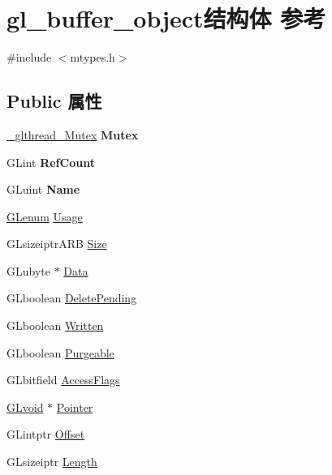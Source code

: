 \hypertarget{structgl__buffer__object}{}\section{gl\+\_\+buffer\+\_\+object结构体 参考}
\label{structgl__buffer__object}


{\ttfamily \#include $<$mtypes.\+h$>$}

\subsection*{Public 属性}
\begin{DoxyCompactItemize}
\item 
\mbox{\label{structgl__buffer__object_a7c4e3ea132cd21993e081d7176bfadf7}} 
\hyperlink{struct___c_r_i_t_i_c_a_l___s_e_c_t_i_o_n}{\+\_\+glthread\+\_\+\+Mutex} {\bfseries Mutex}
\item 
\mbox{\label{structgl__buffer__object_a6d7e11ec2690e5911729a4dcb89082be}} 
G\+Lint {\bfseries Ref\+Count}
\item 
\mbox{\label{structgl__buffer__object_a3db8590422016a58e5961388ff46ebab}} 
G\+Luint {\bfseries Name}
\item 
\hyperlink{interfacevoid}{G\+Lenum} \hyperlink{structgl__buffer__object_a352e4e28541f5fce5a15d37c83f5c575}{Usage}
\item 
G\+Lsizeiptr\+A\+RB \hyperlink{structgl__buffer__object_a471e97d10220fafccb2437b0ae2a8793}{Size}
\item 
G\+Lubyte $\ast$ \hyperlink{structgl__buffer__object_a030c9049a8eb3a86c7ccaa13af7b09b1}{Data}
\item 
G\+Lboolean \hyperlink{structgl__buffer__object_a4adaa410e8287cbdf4e78dab5f0e25f8}{Delete\+Pending}
\item 
G\+Lboolean \hyperlink{structgl__buffer__object_a8f24ec4ece728e3229290f966e3b958b}{Written}
\item 
G\+Lboolean \hyperlink{structgl__buffer__object_ac3f712f3a48fab3cedcbf5aff8f7c876}{Purgeable}
\end{DoxyCompactItemize}
\textbf{ }\par
\begin{DoxyCompactItemize}
\item 
G\+Lbitfield \hyperlink{structgl__buffer__object_a185e8da91ff1f010c89998c6f8d40298}{Access\+Flags}
\item 
\hyperlink{interfacevoid}{G\+Lvoid} $\ast$ \hyperlink{structgl__buffer__object_a0c3e2ae141dfd4858992d7781eae854a}{Pointer}
\item 
G\+Lintptr \hyperlink{structgl__buffer__object_a4cdcaad6f1a0ae4809779ee9adb01655}{Offset}
\item 
G\+Lsizeiptr \hyperlink{structgl__buffer__object_a3cc4869e16c2fd698a7982fd8b9a3881}{Length}
\end{DoxyCompactItemize}



